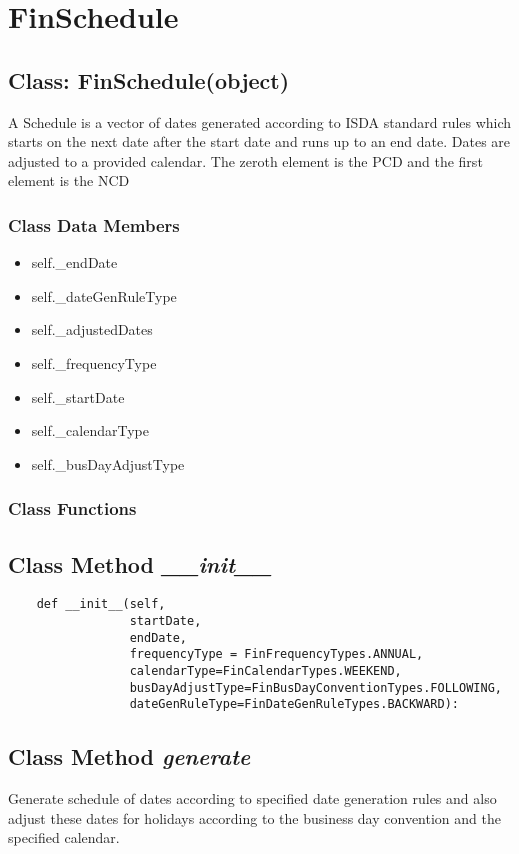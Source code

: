 \documentclass[twoside,11pt]{book}
\begin{document}
\newpage
\section{FinSchedule}

\subsection{Class: FinSchedule(object)}
A Schedule is a vector of dates generated according to ISDA standard rules which starts on the next date after the start date and runs up to an end date. Dates are adjusted to a provided calendar. The zeroth element is the PCD and the first element is the NCD 

\subsubsection{Class Data Members}
\begin{itemize}
\item{self.\_endDate}
\item{self.\_dateGenRuleType}
\item{self.\_adjustedDates}
\item{self.\_frequencyType}
\item{self.\_startDate}
\item{self.\_calendarType}
\item{self.\_busDayAdjustType}
\end{itemize}

\subsubsection{Class Functions}

\subsection{Class Method {\it \_\_init\_\_}}


\begin{lstlisting}
    def __init__(self,
                 startDate,
                 endDate,
                 frequencyType = FinFrequencyTypes.ANNUAL,
                 calendarType=FinCalendarTypes.WEEKEND,
                 busDayAdjustType=FinBusDayConventionTypes.FOLLOWING,
                 dateGenRuleType=FinDateGenRuleTypes.BACKWARD):
\end{lstlisting}

\subsection{Class Method {\it generate}}
Generate schedule of dates according to specified date generation rules and also adjust these dates for holidays according to the business day convention and the specified calendar. 
\end{document}
